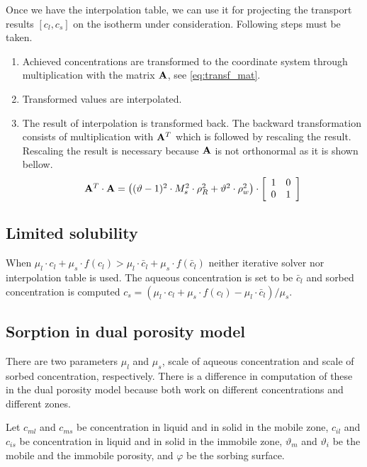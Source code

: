 Once we have the interpolation table, we can use it for projecting the transport results ${[c_l,c_s]}$ on the 
isotherm under consideration. Following steps must be taken.
\begin{enumerate}
 \item Achieved concentrations are transformed to the coordinate system through multiplication with the 
       matrix ${\bf A}$, see \eqref{eq:transf_mat}.
 \item Transformed values are interpolated.
 \item The result of interpolation is transformed back. The backward transformation consists of multiplication 
       with ${\bf A}^T$ which is followed by rescaling the result. Rescaling the result is necessary because  
       ${\bf A}$ is not orthonormal as it is shown bellow.
 \[
 \begin{array}{l}
 {\bf A}^T\cdot{\bf A} =
  \left((\vartheta - 1)^2\cdot M_s^2\cdot \rho_R^2 + \vartheta^2\cdot \rho_w^2\right)\cdot\left[\begin{array}{cc}
    1 & 0\\
    0 & 1
  \end{array}\right]
  \end{array}
 \]
\end{enumerate}


\subsection{Limited solubility}\label{subsec:lim_solub}
When $\mu_l\cdot c_l + \mu_s\cdot f(c_l) > \mu_l\cdot \bar{c}_l + \mu_s\cdot f(\bar{c}_l)$ neither iterative 
solver nor interpolation table is used. The aqueous concentration is set to be $\bar{c}_l$ and sorbed 
concentration is computed $c_s = (\mu_l\cdot c_l + \mu_s\cdot f(c_l) - \mu_l\cdot \bar{c}_l)/\mu_s$.

\subsection{Sorption in dual porosity model} 
\label{subsec:sorp_dual_por}
There are two parameters $\mu_l$ and $\mu_s$, scale of aqueous concentration and scale of sorbed concentration, respectively.  
There is a difference in computation of these in the dual porosity model because both work on different concentrations
and different zones.

Let $c_{ml}$ and $c_{ms}$ be concentration in liquid and in solid in the mobile zone, 
$c_{il}$ and $c_{is}$ be concentration in liquid and in solid in the immobile zone,
$\vartheta_m$ and $\vartheta_i$ be the mobile and the immobile porosity,
and $\varphi$ be the sorbing surface.

